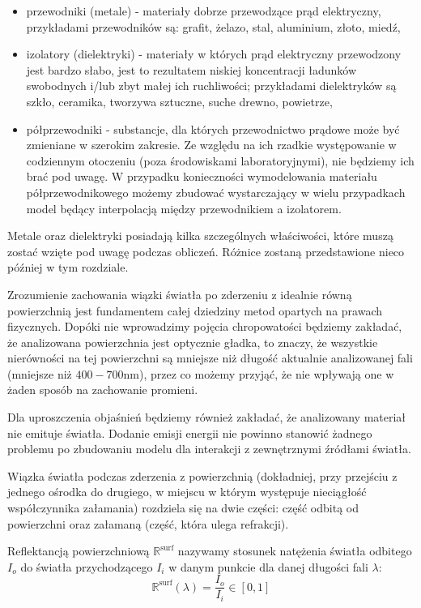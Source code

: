 \documentclass[../main.tex]{subfiles}
\begin{document}
\begin{itemize}
	\item przewodniki (metale) - materiały dobrze przewodzące prąd elektryczny, przykładami przewodników są: grafit, żelazo, stal, aluminium, złoto, miedź,
    
	\item izolatory (dielektryki) - materiały w których prąd elektryczny przewodzony jest bardzo słabo, jest to rezultatem niskiej koncentracji ładunków swobodnych i/lub zbyt małej ich ruchliwości; przykładami dielektryków są szkło, ceramika, tworzywa sztuczne, suche drewno, powietrze,
	
	\item półprzewodniki - substancje, dla których przewodnictwo prądowe może być zmieniane w szerokim zakresie. Ze względu na ich rzadkie występowanie w codziennym otoczeniu (poza środowiskami laboratoryjnymi), nie będziemy ich brać pod uwagę. W przypadku konieczności wymodelowania materiału półprzewodnikowego możemy zbudować wystarczający w wielu przypadkach model będący interpolacją między przewodnikiem a izolatorem.
\end{itemize}

Metale oraz dielektryki posiadają kilka szczególnych właściwości, które muszą zostać wzięte pod uwagę podczas obliczeń. Różnice zostaną przedstawione nieco później w tym rozdziale.

Zrozumienie zachowania wiązki światła po zderzeniu z idealnie równą powierzchnią jest fundamentem całej dziedziny metod opartych na prawach fizycznych. Dopóki nie wprowadzimy pojęcia chropowatości będziemy zakładać, że analizowana powierzchnia jest optycznie gładka, to znaczy, że wszystkie nierówności na tej powierzchni są mniejsze niż długość aktualnie analizowanej fali (mniejsze niż $400-700$nm), przez co możemy przyjąć, że nie wpływają one w żaden sposób na zachowanie promieni.

Dla uproszczenia objaśnień będziemy również zakładać, że analizowany materiał nie emituje światła. Dodanie emisji energii nie powinno stanowić żadnego problemu po zbudowaniu modelu dla interakcji z zewnętrznymi źródłami światła.

Wiązka światła podczas zderzenia z powierzchnią (dokładniej, przy przejściu z jednego ośrodka do drugiego, w miejscu w którym występuje nieciągłość współczynnika załamania) rozdziela się na dwie części: część odbitą od powierzchni oraz załamaną (część, która ulega refrakcji).

Reflektancją powierzchniową $\mathbb{R}^{\text{surf}}$ \cite{pbr_games_siggraph} nazywamy stosunek natężenia światła odbitego $I_o$ do światła przychodzącego $I_i$ w danym punkcie dla danej długości fali $\lambda$:
\begin{equation}
	\mathbb{R}^{\text{surf}}(\lambda) = \frac{
        I_o
    }{
        I_i
    } \in \left[
        0, 1 
    \right]
\label{eq:pbr_surface_reflectance}
\end{equation}
\end{document}
